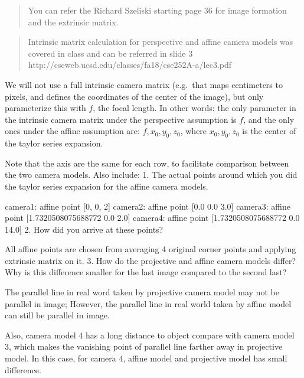 \documentclass[11pt]{article}
\begin{document}
\begin{quote}
You can refer the Richard Szeliski starting page 36 for image formation
and the extrinsic matrix.
\end{quote}

\begin{quote}
Intrinsic matrix calculation for perspective and affine camera models
was covered in class and can be referred in slide 3
http://cseweb.ucsd.edu/classes/fa18/cse252A-a/lec3.pdf
\end{quote}

We will not use a full intrinsic camera matrix (e.g.~that maps
centimeters to pixels, and defines the coordinates of the center of the
image), but only parameterize this with \(f\), the focal length. In
other words: the only parameter in the intrinsic camera matrix under the
perspective assumption is \(f\), and the only ones under the affine
assumption are: \(f,x_0,y_0,z_0\), where \(x_0,y_0,z_0\) is the center
of the taylor series expansion.

Note that the axis are the same for each row, to facilitate comparison
between the two camera models. Also include: 1. The actual points around
which you did the taylor series expansion for the affine camera models.

camera1: affine point {[}0, 0, 2{]} camera2: affine point {[}0.0 0.0
3.0{]} camera3: affine point {[}1.7320508075688772 0.0 2.0{]} camera4:
affine point {[}1.7320508075688772 0.0 14.0{]} 2. How did you arrive at
these points?

All affine points are chosen from averaging 4 original corner points and
applying extrinsic matrix on it. 3. How do the projective and affine
camera models differ? Why is this difference smaller for the last image
compared to the second last?

The parallel line in real word taken by projective camera model may not
be parallel in image; However, the parallel line in real world taken by
affine model can still be parallel in image.

Also, camera model 4 has a long distance to object compare with camera
model 3, which makes the vanishing point of parallel line farther away
in projective model. In this case, for camera 4, affine model and
projective model has small difference.
\end{document}
